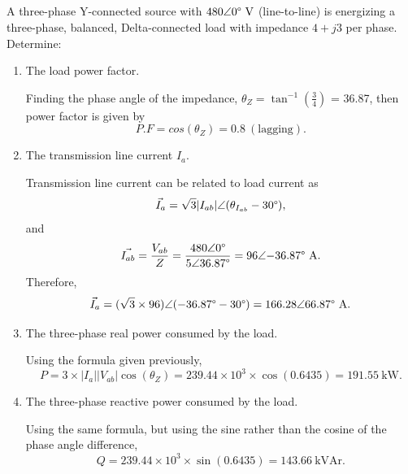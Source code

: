 \documentclass{article}
\begin{document}
\subsection{} A three-phase Y-connected source with \(480\angle{0\degree} \ \mathrm{V}\) (line-to-line) is energizing a three-phase, balanced, Delta-connected load with impedance \(4 + j3\) per phase.  Determine:
\begin{enumerate}[label=\alph*)]
	\item The load power factor.

		Finding the phase angle of the impedance, \(\theta_{Z} = \tan^{-1}{(\frac{3}{4})}\) = 36.87\degree, then power factor is given by \[
			P.F = cos(\theta_{Z}) = 0.8 \ \mathrm{(lagging)}.
		\]
	\item The transmission line current \(I_a\).

		Transmission line current can be related to load current as \[
			\vec{I}_a = \sqrt{3}|I_{ab}|\angle{(\theta_{I_{ab}}-30\degree}),
		\]
		and \[
			\vec{I_{ab}} = \frac{V_{ab}}{Z} = \frac{480\angle{0\degree}}{5\angle{36.87\degree}} = 96\angle{-36.87\degree} \ \mathrm{A}.
		\]
		Therefore, \[
			\vec{I}_a = (\sqrt{3} \times 96) \angle{(-36.87\degree - 30\degree)} = 166.28\angle{\-66.87\degree} \ \mathrm{A}.
		\]
	\item The three-phase real power consumed by the load.

		Using the formula given previously, \[
			P = 3 \times |I_{a}||V_{ab}|\cos{(\theta_{Z})} = 239.44 \times 10^3 \times \cos{(0.6435)} = 191.55 \ \mathrm{kW}.
		\] 
	\item The three-phase reactive power consumed by the load.

		Using the same formula, but using the sine rather than the cosine of the phase angle difference, \[
			Q = 239.44 \times 10^3 \times \sin{(0.6435)} = 143.66 \ \mathrm{kVAr}.
		\]
\end{enumerate}
\end{document}
